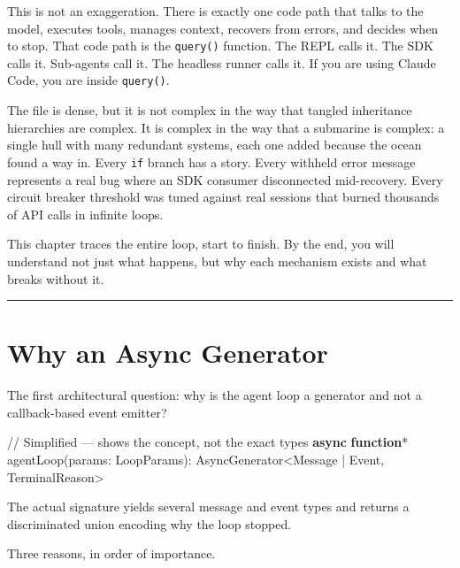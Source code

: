 \documentclass[
  english,
  11pt,
  letterpaper,
]{book}
\newenvironment{Shaded}{\begin{snugshade}}{\end{snugshade}}
\newcommand{\BuiltInTok}[1]{\textcolor[rgb]{0.00,0.23,0.31}{#1}}
\newcommand{\CommentTok}[1]{\textcolor[rgb]{0.37,0.37,0.37}{#1}}
\newcommand{\FunctionTok}[1]{\textcolor[rgb]{0.28,0.35,0.67}{#1}}
\newcommand{\KeywordTok}[1]{\textcolor[rgb]{0.00,0.23,0.31}{\textbf{#1}}}
\newcommand{\NormalTok}[1]{\textcolor[rgb]{0.00,0.23,0.31}{#1}}
\newcommand{\OperatorTok}[1]{\textcolor[rgb]{0.37,0.37,0.37}{#1}}
\begin{document}
This is not an exaggeration. There is exactly one code path that talks
to the model, executes tools, manages context, recovers from errors, and
decides when to stop. That code path is the \texttt{query()} function.
The REPL calls it. The SDK calls it. Sub-agents call it. The headless
runner calls it. If you are using Claude Code, you are inside
\texttt{query()}.

The file is dense, but it is not complex in the way that tangled
inheritance hierarchies are complex. It is complex in the way that a
submarine is complex: a single hull with many redundant systems, each
one added because the ocean found a way in. Every \texttt{if} branch has
a story. Every withheld error message represents a real bug where an SDK
consumer disconnected mid-recovery. Every circuit breaker threshold was
tuned against real sessions that burned thousands of API calls in
infinite loops.

This chapter traces the entire loop, start to finish. By the end, you
will understand not just what happens, but why each mechanism exists and
what breaks without it.

\begin{center}\rule{0.5\linewidth}{0.5pt}\end{center}

\section{Why an Async Generator}\label{why-an-async-generator}

The first architectural question: why is the agent loop a generator and
not a callback-based event emitter?

\begin{Shaded}
\begin{Highlighting}[]
\CommentTok{// Simplified — shows the concept, not the exact types}
\KeywordTok{async} \KeywordTok{function}\OperatorTok{*} \FunctionTok{agentLoop}\NormalTok{(params}\OperatorTok{:}\NormalTok{ LoopParams)}\OperatorTok{:}\NormalTok{ AsyncGenerator}\OperatorTok{\textless{}}\NormalTok{Message }\OperatorTok{|} \BuiltInTok{Event}\OperatorTok{,}\NormalTok{ TerminalReason}\OperatorTok{\textgreater{}}
\end{Highlighting}
\end{Shaded}

The actual signature yields several message and event types and returns
a discriminated union encoding why the loop stopped.

Three reasons, in order of importance.
\end{document}
